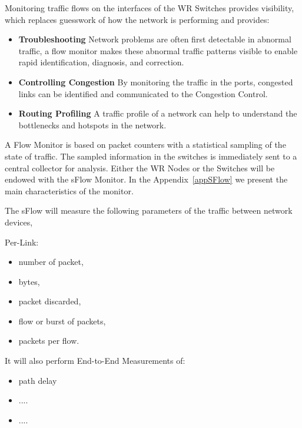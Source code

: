 Monitoring traffic flows on the interfaces of the WR Switches
provides visibility, which replaces guesswork of how the network is performing
and provides: 

\begin{itemize}
	\item \textbf{Troubleshooting} Network problems are often first
detectable in abnormal traffic, a flow monitor makes these abnormal traffic
patterns visible to enable rapid identification, diagnosis, and correction.

	\item \textbf{Controlling Congestion} By monitoring the traffic in the 
ports, congested links can be identified and communicated to the Congestion
Control.

	\item \textbf{Routing Profiling} A traffic profile of a network can 
help to understand the bottlenecks and hotspots in the network. 

\end{itemize}

\vspace{10 mm}

A Flow Monitor is based on packet counters with a statistical sampling of the
state of traffic. The sampled information in the switches is immediately sent to
a central collector for analysis. Either the WR Nodes or the Switches will be
endowed with the sFlow Monitor. In the Appendix~\ref{appSFlow} we present the
main characteristics of the monitor.

The sFlow will measure the following parameters of the traffic between
network devices,

\noindent Per-Link:
		\begin{itemize}	
			\item number of packet,
			\item bytes,
			\item packet discarded,
			\item flow or burst of packets,
			\item packets per flow.
		\end{itemize}

\noindent It will also perform End-to-End Measurements of:
		\begin{itemize}	
			\item path delay  
			\item ....
			\item ....
		\end{itemize} 

